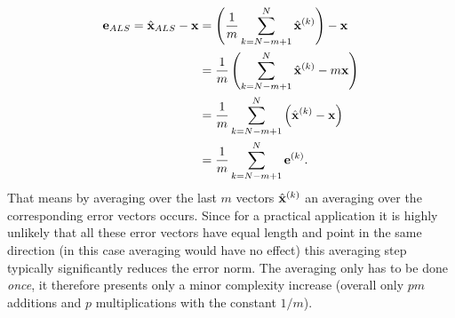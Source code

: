 \documentclass{article}
\begin{document}
\begin{align}
{\bf e}_{ALS} =  \hat{\bf x}_{ALS} - {\bf x} &= \left( \frac{1}{m} \sum_{k = N-m+1}^N \hat{\bf x}^{(k)} \right ) - {\bf x}\\
                                         &=  \frac{1}{m} \left(\sum_{k = N-m+1}^N \hat{\bf x}^{(k)}  - m{\bf x}\right )\\
                                         &=  \frac{1}{m} \sum_{k = N-m+1}^N \left(\hat{\bf x}^{(k)}  - {\bf x}\right )\\
                                         &=  \frac{1}{m} \sum_{k = N-m+1}^N {\bf e}^{(k)}.
\end{align}
That means by averaging over the last $m$ vectors $\hat{\bf x}^{(k)}$ an averaging 
over the 
corresponding error vectors occurs.
Since for a practical application it is highly unlikely that all these error vectors 
have equal length and 
point in the same direction
(in this case averaging would have no effect) this averaging step typically 
significantly reduces the error norm.
The averaging only has to be done \emph{once}, it therefore presents only a minor 
complexity 
increase (overall only $pm$ additions and $p$ multiplications with the constant 
$1/m$).
\end{document}
